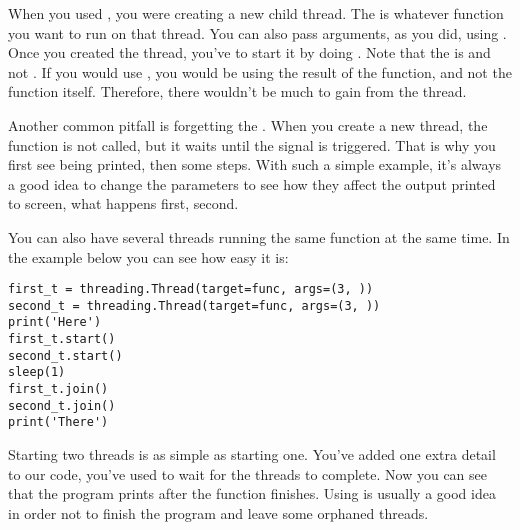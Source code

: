 When you used , you were creating a new child thread. The  is whatever function you want to run on that thread. You can also pass arguments, as you did, using . Once you created the thread, you've to start it by doing . Note that the  is  and not . If you would use , you would be using the result of the function, and not the function itself. Therefore, there wouldn't be much to gain from the thread.


Another common pitfall is forgetting the . When you create a new thread, the function is not called, but it waits until the  signal is triggered. That is why you first see  being printed, then some steps. With such a simple example, it's always a good idea to change the parameters to see how they affect the output printed to screen, what happens first, second.

You can also have several threads running the same function at the same time. In the example below you can see how easy it is:

\begin{verbatim}
first_t = threading.Thread(target=func, args=(3, ))
second_t = threading.Thread(target=func, args=(3, ))
print('Here')
first_t.start()
second_t.start()
sleep(1)
first_t.join()
second_t.join()
print('There')
\end{verbatim}

Starting two threads is as simple as starting one. You've added one extra detail to our code, you've used  to wait for the threads to complete. Now you can see that the program prints  after the function finishes. Using  is usually a good idea in order not to finish the program and leave some orphaned threads.


